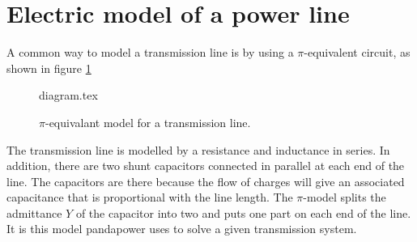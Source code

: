 \documentclass[class=book, crop=false]{standalone}
\begin{document}
\section{Electric model of a power line}
A common way to model a transmission line is by using a $\pi$-equivalent circuit, as shown in figure \ref{fig:theory:PI_model}

\begin{figure}[ht!]
    {diagram.tex}
    \caption{$\pi$-equivalant model for a transmission line.}
    \label{fig:theory:PI_model}
\end{figure}



The transmission line is modelled by a resistance and inductance in series. In addition, there are two shunt capacitors connected in parallel at each end of the line. The capacitors are there because the flow of charges will give an associated capacitance that is proportional with the line length. The $\pi$-model splits the admittance $Y$ of the capacitor into two and puts one part on each end of the line. It is this model pandapower uses to solve a given transmission system. 
\end{document}
